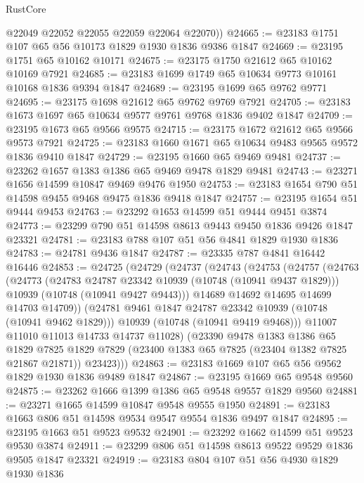 \begin{lexlean}{RustCore}
\begin{coremodule}
        @22049
        @22052
        @22055
        @22059
        @22064
        @22070))
@24665 := @23183 @1751 @107 @65 @56 @10173 @1829 @1930 @1836 @9386 @1847
@24669 := @23195 @1751 @65 @10162 @10171
@24675 := @23175 @1750 @21612 @65 @10162 @10169 @7921
@24685 := @23183 @1699 @1749 @65 @10634 @9773 @10161 @10168 @1836 @9394 @1847
@24689 := @23195 @1699 @65 @9762 @9771
@24695 := @23175 @1698 @21612 @65 @9762 @9769 @7921
@24705 := @23183 @1673 @1697 @65 @10634 @9577 @9761 @9768 @1836 @9402 @1847
@24709 := @23195 @1673 @65 @9566 @9575
@24715 := @23175 @1672 @21612 @65 @9566 @9573 @7921
@24725 := @23183 @1660 @1671 @65 @10634 @9483 @9565 @9572 @1836 @9410 @1847
@24729 := @23195 @1660 @65 @9469 @9481
@24737 := @23262 @1657 @1383 @1386 @65 @9469 @9478 @1829 @9481
@24743 := @23271 @1656 @14599 @10847 @9469 @9476 @1950
@24753 := @23183 @1654 @790 @51 @14598 @9455 @9468 @9475 @1836 @9418 @1847
@24757 := @23195 @1654 @51 @9444 @9453
@24763 := @23292 @1653 @14599 @51 @9444 @9451 @3874
@24773 := @23299 @790 @51 @14598 @8613 @9443 @9450 @1836 @9426 @1847 @23321
@24781 := @23183 @788 @107 @51 @56 @4841 @1829 @1930 @1836
@24783 := @24781 @9436 @1847
@24787 := @23335 @787 @4841 @16442 @16446
@24853 := @24725
    (@24729
      (@24737
        (@24743
          (@24753
            (@24757
              (@24763
                (@24773
                  (@24783 @24787 @23342 @10939 (@10748 (@10941 @9437 @1829)))
                  @10939
                  (@10748 (@10941 @9427 @9443)))
                @14689
                @14692
                @14695
                @14699
                @14703
                @14709))
            (@24781 @9461 @1847 @24787 @23342 @10939 (@10748 (@10941 @9462 @1829)))
            @10939
            (@10748 (@10941 @9419 @9468)))
          @11007
          @11010
          @11013
          @14733
          @14737
          @11028)
        (@23390
          @9478
          @1383
          @1386
          @65
          @1829
          @7825
          @1829
          @7829
          (@23400 @1383 @65 @7825 (@23404 @1382 @7825 @21867 @21871))
          @23423)))
@24863 := @23183 @1669 @107 @65 @56 @9562 @1829 @1930 @1836 @9489 @1847
@24867 := @23195 @1669 @65 @9548 @9560
@24875 := @23262 @1666 @1399 @1386 @65 @9548 @9557 @1829 @9560
@24881 := @23271 @1665 @14599 @10847 @9548 @9555 @1950
@24891 := @23183 @1663 @806 @51 @14598 @9534 @9547 @9554 @1836 @9497 @1847
@24895 := @23195 @1663 @51 @9523 @9532
@24901 := @23292 @1662 @14599 @51 @9523 @9530 @3874
@24911 := @23299 @806 @51 @14598 @8613 @9522 @9529 @1836 @9505 @1847 @23321
@24919 := @23183 @804 @107 @51 @56 @4930 @1829 @1930 @1836

\end{coremodule}
\end{lexlean}
